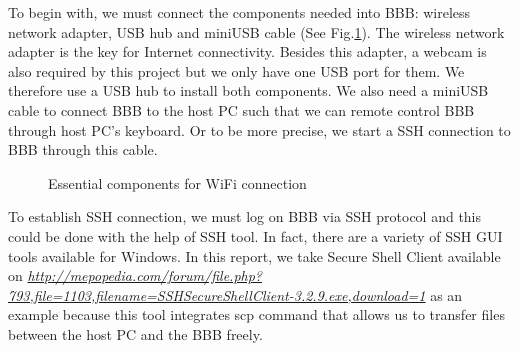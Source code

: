 \documentclass[12pt,journal,draftclsnofoot,onecolumn]{IEEEtran}
\begin{document}
To begin with, we must connect the components needed into BBB: wireless network adapter, USB hub and miniUSB cable (See Fig.\ref{WiFi}). The wireless network adapter is the key for Internet connectivity. Besides this adapter, a webcam is also required by this project but we only have one USB port for them.  We therefore use a USB hub to install both components. We also need a miniUSB cable to connect BBB to the host PC such that we can remote control BBB through host PC's keyboard. Or to be more precise, we start a SSH connection to BBB through this cable.

\begin{figure}[htb]
	\centering
     \caption{Essential components for WiFi connection}
     \label{WiFi}
     \end{figure}

To establish SSH connection, we must log on BBB via SSH protocol and this could be done with the help of SSH tool. In fact, there are a variety of SSH GUI tools available for Windows. In this report, we take Secure Shell Client available on \textcolor{blue}{\textit{\url{http://mepopedia.com/forum/file.php?793,file=1103,filename=SSHSecureShellClient-3.2.9.exe,download=1}}}  as an example because this tool integrates scp command that allows us to transfer files between the host PC and the BBB freely.
\end{document}
